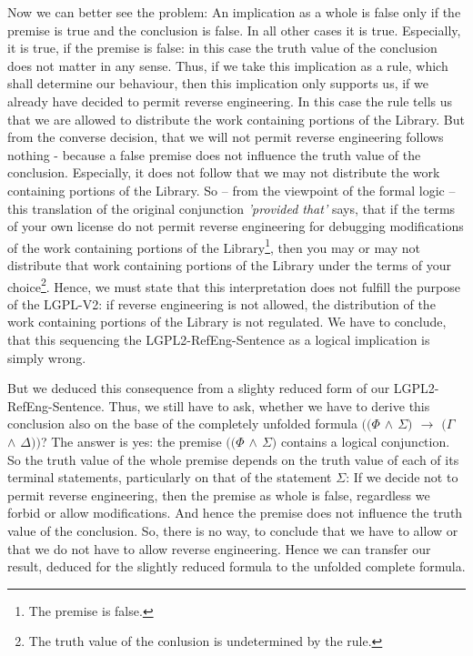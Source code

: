 Now we can better see the problem: An implication as a whole is false only if
the premise is true and the conclusion is false. In all other cases it is true.
Especially, it is true, if the premise is false: in this case the truth value of
the conclusion does not matter in any sense. Thus, if we take this implication
as a rule, which shall determine our behaviour, then this implication only
supports us, if we already have decided to permit reverse engineering. In this
case the rule tells us that we are allowed to distribute the work containing
portions of the Library. But from the converse decision, that we will not permit
reverse engineering follows nothing - because a false premise does not influence
the truth value of the conclusion. Especially, it does not follow that we may
not distribute the work containing portions of the Library. So -- from the
viewpoint of the formal logic -- this translation of the original conjunction 
\emph{'provided that'} says, that if the terms of your own license do not permit
reverse engineering for debugging modifications of the work containing portions
of the Library\footnote{The premise is false.}, then you may or may not
distribute that work containing portions of the Library under the terms of your
choice\footnote{The truth value of the conlusion is undetermined by the rule.}.
Hence, we must state that this interpretation does not fulfill the purpose of
the LGPL-V2: if reverse engineering is not allowed, the distribution of the work
containing portions of the Library is not regulated. We have to conclude, that
this sequencing the LGPL2-RefEng-Sentence as a logical implication is simply
wrong.

But we deduced this consequence from a slighty reduced form of our
LGPL2-RefEng-Sentence. Thus, we still have to ask, whether we have to derive
this conclusion also on the base of the completely unfolded formula
\emph{$((\Phi$ $\wedge$ $\Sigma)$ $\rightarrow$ $(\Gamma$ $\wedge$ $\Delta))$}?
The answer is yes: the premise \emph{$((\Phi$ $\wedge$ $\Sigma)$} contains a
logical conjunction. So the truth value of the whole premise depends on the
truth value of each of its terminal statements, particularly on that of the
statement $\Sigma$: If we decide not to permit reverse engineering, then the
premise as whole is false, regardless we forbid or allow modifications. And
hence the premise does not influence the truth value of the conclusion. So,
there is no way, to conclude that we have to allow or that we do not have to
allow reverse engineering. Hence we can transfer our result, deduced for the
slightly reduced formula to the unfolded complete formula.

